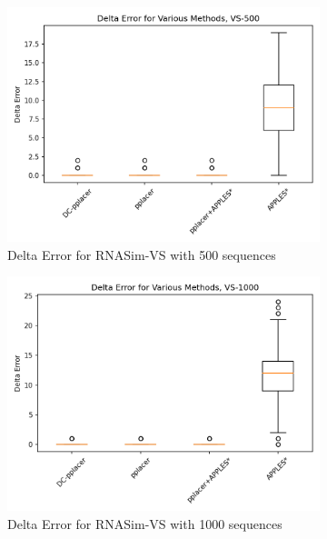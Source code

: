 \documentclass[10pt]{article}
\begin{document}
\begin{figure}[!htb]
\begin{subfigure}{0.5\textwidth}
\centering
\includegraphics[width=\textwidth]{Figs/VS-delta-error-500.png}
\caption{Delta Error for RNASim-VS with 500 sequences}
\label{fig:error500}
\end{subfigure}
\begin{subfigure}{0.5\textwidth}
\centering
\includegraphics[width=\textwidth]{Figs/VS-delta-error-1000.png}
\caption{Delta Error for RNASim-VS with 1000 sequences}
\label{fig:error1000}
\end{subfigure}\\
\begin{subfigure}{0.5\textwidth}

\end{subfigure}
\end{figure}
\end{document}
